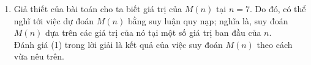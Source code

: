 \begin{bt}
{\begin{nx}
\begin{enumerate}[1.]
				Để giải bài toán khái quát (nhận được từ bài đã ra bằng cách thay $2017$ bởi $n\geq 7$), với $f_X(n)$ là kí hiệu đã được định nghĩa trong lời giải nêu trên, ta cần tìm ra một biểu thức của $n$, gọi là $M(n),$ sao cho $$f_X(n) \leq M(n),$$ với mọi Festival $X$ thỏa mãn yêu cầu đề bài và với mọi số nguyên $n \geq 7$.
				\item Giả thiết của bài toán cho ta biết giá trị của $M(n)$ tại $n=7$. Do đó, có thể nghĩ tới việc dự đoán $M(n)$ bằng suy luận quy nạp; nghĩa là, suy đoán $M(n)$ dựa trên các giá trị của nó tại một số giá trị ban đầu của $n$.\\
				Đánh giá (1) trong lời giải là kết quả của việc suy đoán $M(n)$ theo cách vừa nêu trên.
				
			\end{enumerate}
		\end{nx} 
	}
\end{bt}

